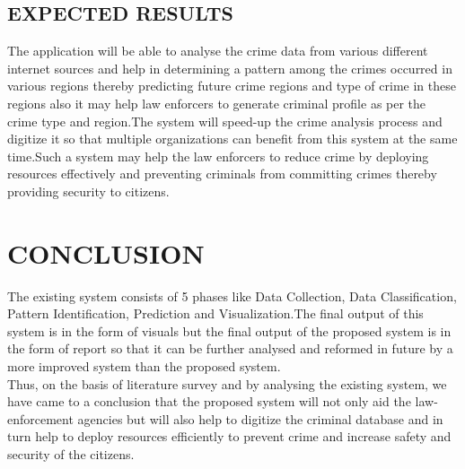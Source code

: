 \documentclass[12pt]{extreport}
\begin{document}
\section{EXPECTED RESULTS}
\hspace*{5em}The application will be able to analyse the crime data from various different internet sources and help in determining a pattern among the crimes occurred in various regions thereby predicting future crime regions and type of crime in these regions also it may help law enforcers to generate criminal profile as per the crime type and region.The system will speed-up the crime analysis process and digitize it so that multiple organizations can benefit from this system at the same time.Such a system may help the law enforcers to reduce crime by deploying resources effectively and preventing criminals from committing crimes thereby providing security to citizens.

\chapter{CONCLUSION}
\hspace*{5em}The existing system consists of 5 phases like Data Collection, Data Classification, Pattern Identification, Prediction and Visualization.The final output of this system is in the form of visuals but the final output of the proposed system is in the form of report so that it can be further analysed and reformed in future by a more improved system than the proposed system.\\

Thus, on the basis of literature survey and by analysing the existing system, we have came to a conclusion that the proposed system will not only aid the law-enforcement agencies but will also help to digitize the criminal database  and in turn help to deploy resources efficiently to prevent crime and increase safety and security of the citizens.
\end{document}
